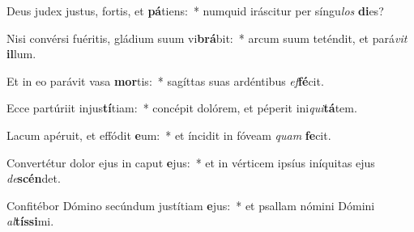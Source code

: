 \item Deus judex justus, fortis, et \textbf{pá}tiens:~* numquid iráscitur per síngu\textit{los} \textbf{di}es?
\item Nisi convérsi fuéritis, gládium suum vi\textbf{brá}bit:~* arcum suum teténdit, et pará\textit{vit} \textbf{il}lum.
\item Et in eo parávit vasa \textbf{mor}tis:~* sagíttas suas ardéntibus \textit{ef}\textbf{fé}cit.
\item Ecce partúriit injus\textbf{tí}tiam:~* concépit dolórem, et péperit ini\textit{qui}\textbf{tá}tem.
\item Lacum apéruit, et effódit \textbf{e}um:~* et íncidit in fóveam \textit{quam} \textbf{fe}cit.
\item Convertétur dolor ejus in caput \textbf{e}jus:~* et in vérticem ipsíus iníquitas ejus \textit{de}\textbf{scén}det.
\item Confitébor Dómino secúndum justítiam \textbf{e}jus:~* et psallam nómini Dómini \textit{al}\textbf{tís}\textbf{si}mi.
